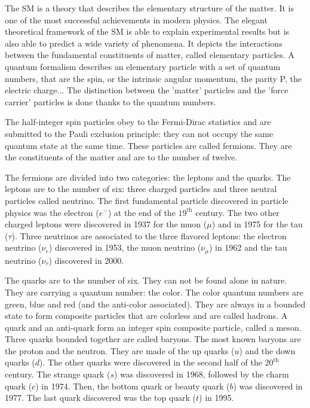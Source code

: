     The \gls{SM} is a theory that describes the elementary structure of the matter. 
    It is one of the most successful achievements in modern physics.
    The elegant theoretical framework of the \gls{SM} is able to explain experimental results but is also able to predict a wide variety of phenomena.
    It depicts the interactions between the fundamental constituents of matter, called elementary particles.
    A quantum formalism describes an elementary particle with a set of quantum numbers, that are the spin, or the intrinsic angular momentum, the parity P, the electric charge...
    The distinction between the 'matter' particles and the 'force carrier' particles is done thanks to the quantum numbers.
    
    The half-integer spin particles obey to the Fermi-Dirac statistics and are submitted to the Pauli exclusion principle:
    they can not occupy the same quantum state at the same time.
    These particles are called fermions.
    They are the constituents of the matter and are to the number of twelve.

    The fermions are divided into two categories: the leptons and the quarks. 
    The leptons are to the number of six: three charged particles and three neutral particles called neutrino.
    The first fundamental particle discovered in particle physics was the electron ($e^-$) at the end of the $19^{\textrm{th}}$ century.
    The two other charged leptons were discovered in 1937 for the muon ($\mu$) and in 1975 for the tau ($\tau$).
    Three neutrinos are associated to the three flavored leptons: the electron neutrino ($\nu_e$) discovered in 1953, the muon neutrino ($\nu_{\mu}$) in 1962\cite{Erwin1961} and the tau neutrino ($\nu_{\tau}$) discovered in 2000\cite{DONUT2000}.

    The quarks are to the number of six.
    They can not be found alone in nature.
    They are carrying a quantum number: the color.
    The color quantum numbers are green, blue and red (and the anti-color associated).
    They are always in a bounded state to form composite particles that are colorless and are called hadrons.
    A quark and an anti-quark form an integer spin composite particle, called a meson.
    Three quarks bounded together are called baryons. The most known baryons are the proton and the neutron.
    They are made of the up quarks ($u$) and the down quarks ($d$).
    The other quarks were discovered in the second half of the $20^{\textrm{th}}$ century.
    The strange quark ($s$) was discovered in 1968, followed by the charm quark ($c$) in 1974.
    Then, the bottom quark or beauty quark ($b$) was discovered in 1977.
    The last quark discovered was the top quark ($t$) in 1995.  


